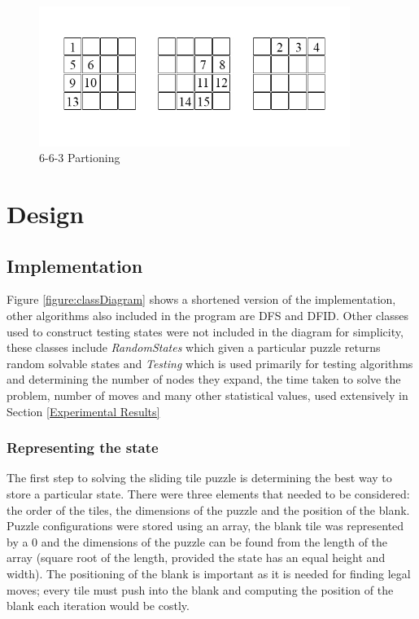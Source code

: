 \documentclass[final]{cmpreport}
\begin{document}
\begin{figure}[ht]
	\centering
	\includegraphics[width=0.9\textwidth]{15tile}
	\captionsetup{justification=centering}
	\caption{6-6-3 Partioning}
	\label{fig:partitioning}
\end{figure}
\section{Design}


\subsection{Implementation}
Figure \ref{figure:classDiagram} shows a shortened version of the implementation, other algorithms also included in the program are DFS and DFID. Other classes used to construct testing states were not included in the diagram for simplicity, these classes include \textit{RandomStates} which given a particular puzzle returns random solvable states and \textit{Testing} which is used primarily for testing algorithms and determining the number of nodes they expand, the time taken to solve the problem, number of moves and many other statistical values, used extensively in Section \ref{Experimental Results}
\subsubsection{Representing the state}
The first step to solving the sliding tile puzzle is determining the best way to store a particular state. There were three elements that needed to be considered: the order of the tiles, the dimensions of the puzzle and the position of the blank. Puzzle configurations were stored using an array, the blank tile was represented by a 0 and the dimensions of the puzzle can be found from the length of the array (square root of the length, provided the state has an equal height and width). The positioning of the blank is important as it is needed for finding legal moves; every tile must push into the blank and computing the position of the blank each iteration would be costly.
\end{document}
